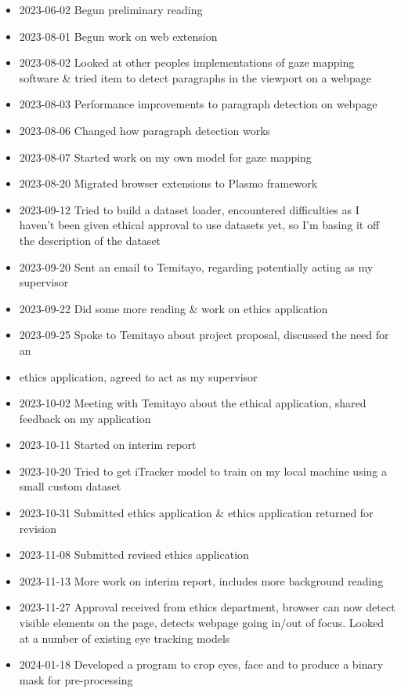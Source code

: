 \documentclass{report}
\begin{document}
\begin{itemize}
    \item 2023-06-02 Begun preliminary reading 
    \item 2023-08-01 Begun work on web extension 
    \item 2023-08-02 Looked at other peoples implementations of gaze mapping software \& tried item to detect paragraphs in the viewport on a webpage 
    \item 2023-08-03 Performance improvements to paragraph detection on webpage 
    \item 2023-08-06 Changed how paragraph detection works 
    \item 2023-08-07 Started work on my own model for gaze mapping 
    \item 2023-08-20 Migrated browser extensions to Plasmo framework 
    \item 2023-09-12 Tried to build a dataset loader, encountered difficulties as I haven't been given ethical approval to use datasets yet, so I'm basing it off the description of the dataset
    \item 2023-09-20 Sent an email to Temitayo, regarding potentially acting as my supervisor
    \item 2023-09-22 Did some more reading \& work on ethics application  
    \item 2023-09-25 Spoke to Temitayo about project proposal, discussed the need for an
    \item ethics application, agreed to act as my supervisor 
    \item 2023-10-02 Meeting with Temitayo about the ethical application, shared feedback on my application 
    \item 2023-10-11 Started on interim report 
    \item 2023-10-20 Tried to get iTracker model to train on my local machine using a small custom dataset 
    \item 2023-10-31 Submitted ethics application \& ethics application returned for revision
    \item 2023-11-08 Submitted revised ethics application 
    \item 2023-11-13 More work on interim report, includes more background reading 
    \item 2023-11-27 Approval received from ethics department, browser can now detect visible elements on the page, detects webpage going in/out of focus. Looked at a number of existing eye tracking models   
    \item 2024-01-18 Developed a program to crop eyes, face and to produce a binary mask for pre-processing 

\end{itemize}
\end{document}
